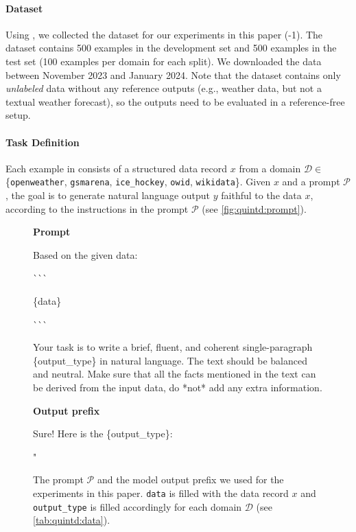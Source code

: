 \paragraph{\benchmark{} Dataset}
\label{sec:quintd:dataset}
Using \datatool{}, we collected the dataset for our experiments in this paper (\datatool{}-1). The dataset contains 500 examples in the development set and 500 examples in the test set (100 examples per domain for each split).
We downloaded the data between November 2023 and January 2024. Note that the dataset contains only \emph{unlabeled} data without any reference outputs (e.g., weather data, but not a textual weather forecast), so the outputs need to be evaluated in a reference-free setup.



\paragraph{Task Definition}
Each example in \benchmark{} consists of a structured data record $x$ from a domain $\mathcal{D} \in $ \{\texttt{openweather}, \texttt{gsmarena}, \texttt{ice\_hockey}, \texttt{owid}, \texttt{wikidata}\}. Given $x$ and a prompt $\mathcal{P}$, the goal is to generate natural language output $y$ faithful to the data $x$, according to the instructions in the prompt $\mathcal{P}$ (see \autoref{fig:quintd:prompt}).

\begin{figure}[t]
    \centering
    \small
    \textbf{Prompt}
    \begin{verbatimbox}
        Based on the given data:

        \`{}\`{}\`{}

        \{data\}

        \`{}\`{}\`{}

        Your task is to write a brief, fluent, and
        coherent single-paragraph \{output\_type\} in natural
        language. The text should be balanced and neutral.
        Make sure that all the facts mentioned in the text
        can be derived from the input data, do *not* add
        any extra information.
    \end{verbatimbox}
    \textbf{Output prefix}
    \begin{verbatimbox}
        Sure! Here is the \{output\_type\}:

        "
    \end{verbatimbox}
    \caption[The prompt and the model output prefix.]{The prompt $\mathcal{P}$ and the model output prefix we used for the experiments in this paper. \texttt{data} is filled with the data record  $x$ and \texttt{output\_type} is filled accordingly for each domain $\mathcal{D}$ (see \autoref{tab:quintd:data}).}
    \label{fig:quintd:prompt}
\end{figure}




